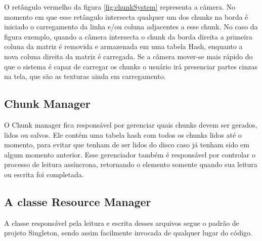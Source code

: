 \documentclass[12pt, 
openright, 
oneside, 
a4paper,    
brazil]{facom-ufu-abntex2}
\begin{document}
O retângulo vermelho da figura \ref{fig:chunkSystem} representa a câmera. No momento em que esse retângulo intersecta qualquer um dos chunks na borda é iniciado o carregamento da linha e/ou coluna adjacentes a esse chunk. No caso da figura exemplo, quando a câmera intersecta o chunk da borda direita a primeira coluna da matriz é removida e armazenada em uma tabela Hash, enquanto a nova coluna direita da matriz é carregada. Se a câmera mover-se mais rápido do que o sistema é capaz de carregar os chunks o usuário irá presenciar partes cinzas na tela, que são as texturas ainda em carregamento.

\subsection{Chunk Manager}
O Chunk manager fica responsável por gerenciar quais chunks devem ser gerados, lidos ou salvos. Ele contém uma tabela hash com todos os chunks lidos até o momento, para evitar que tenham de ser lidos do disco caso já tenham sido em algum momento anterior.
Esse gerenciador também é responsável por controlar o processo de leitura assíncrona, retornando o elemento somente quando sua leitura ou escrita foi completada.

\subsection{A classe Resource Manager}
A classe responsável pela leitura e escrita desses arquivos segue o padrão de projeto Singleton, sendo assim facilmente invocada de qualquer lugar do código.
\end{document}
